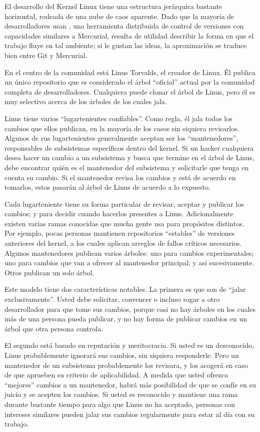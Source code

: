 El desarrollo del Kernel Linux tiene una estructura jerárquica
bastante horizontal, rodeada de una nube de caos aparente. Dado que la
mayoría de desarrolladores usan , una herramienta distribuida
de control de versiones con capacidades similares a Mercurial, resulta
de utilidad describir la forma en que el trabajo fluye en tal
ambiente; si le gustan las ideas, la aproximación se traduce bien
entre Git y Mercurial.

En el centro de la comunidad está Linus Torvalds, el creador de Linux.
Él publica un único repositorio que es considerado el árbol
``oficial'' actual por la comunidad completa de
desarrolladores. Cualquiera puede clonar el árbol de Linus, pero él es
muy selectivo acerca de los árboles de los cuales jala.

Linus tiene varios ``lugartenientes confiables''.  Como regla, él jala
todos los cambios que ellos publican, en la mayoría de los casos sin
siquiera revisarlos.  Algunos de sus lugartenientes generalmente
aceptan ser los ``mantenedores'', responsables de subsistemas
específicos dentro del kernel.  Si un hacker cualquiera desea hacer un
cambio a un subsistema y busca que termine en el árbol de Linus, debe
encontrar quién es el mantenedor del subsistema y solicitarle que
tenga en cuenta su cambio.  Si el mantenedor revisa los cambios y está
de acuerdo en tomarlos, estos pasarán al árbol de Linus de acuerdo a
lo expuesto.

Cada lugarteniente tiene su forma particular de revisar, aceptar y
publicar los cambios; y para decidir cuando hacerlos presentes a
Linus.  Adicionalmente existen varias ramas conocidas que mucha gente
usa para propósitos distintos. Por ejemplo, pocas personas mantienen
repositorios ``estables'' de versiones anteriores del kernel, a los
cuales aplican arreglos de fallos críticos necesarios. Algunos
mantenedores publican varios árboles: uno para cambios
experimentales; uno para cambios que van a ofrecer al mantenedor
principal; y así sucesivamente. Otros publican un solo árbol.

Este modelo tiene dos características notables. La primera es que son
de ``jalar exclusivamente''.  Usted debe solicitar, convencer o
incluso rogar a otro desarrollador para que tome sus cambios, porque
casi no hay árboles en los cuales más de una persona pueda publicar, y
no hay forma de publicar cambios en un árbol que otra persona controla.

El segundo está basado en reputación y meritocracia.  Si usted es un
desconocido, Linus probablemente ignorará sus cambios, sin siquiera
responderle.  Pero un mantenedor de un subsistema probablemente los
revisara, y los acogerá en caso de que aprueben su criterio de
aplicabilidad.  A medida que usted ofrezca ``mejores'' cambios a un
mantenedor, habrá más posibilidad de que se confíe en su juicio y se
acepten los cambios.   Si usted es reconocido y mantiene una rama
durante bastante tiempo para algo que Linus no ha aceptado, personas
con intereses similares pueden jalar sus cambios regularmente para
estar al día con su trabajo.

